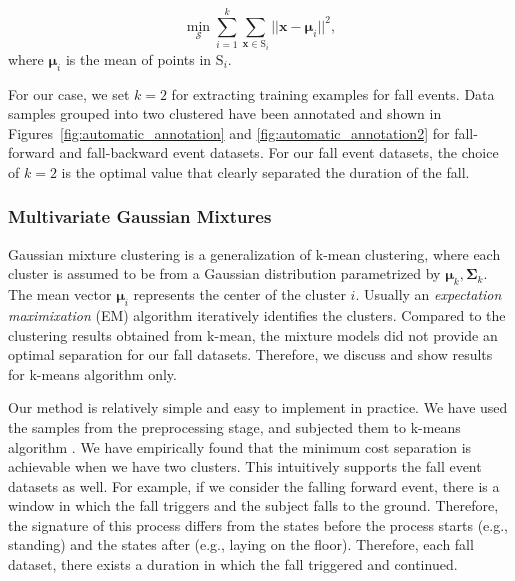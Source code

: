 \documentclass{IEEEtran}
\begin{document}
$$ \min _{\mathcal{S}} \sum_{i=1}^{k} \sum_{\mathbf{x} \in \mathrm{S}_i} || \mathbf{x} - 
\boldsymbol{\mu}_i 
||^2,$$
where $\boldsymbol{\mu}_i $ is the mean of points in $\mathrm{S}_i$.

For our case, we set $k = 2$ for extracting  training examples for fall events. Data samples grouped into two
clustered have been annotated and shown in Figures~\ref{fig:automatic_annotation} and 
\ref{fig:automatic_annotation2} for fall-forward and fall-backward event datasets. For our fall event datasets, the choice of $k=2$ is the 
optimal value that clearly separated the duration of the fall. 


\subsubsection{Multivariate Gaussian Mixtures}

Gaussian mixture clustering is a generalization of k-mean clustering, where each cluster 
is assumed to be from a Gaussian distribution parametrized by $\boldsymbol{\mu}_k, 
\boldsymbol{\Sigma}_k$. The mean vector $\boldsymbol{\mu}_i$ represents the center of the 
cluster $i$. 
Usually an \emph{expectation maximixation} (EM) algorithm iteratively identifies the 
clusters. Compared to the clustering results obtained from k-mean, the mixture models did not 
provide an optimal separation for our fall datasets. Therefore, we discuss and show results for
k-means algorithm only. 
 


Our method is relatively simple and easy to implement in practice. We have used the 
samples from the preprocessing stage, and subjected them to k-means algorithm 
\cite{Bishop06a}. We have empirically found that the minimum cost separation is 
achievable when we have two clusters. This intuitively supports the fall event datasets 
as well. For 
example, if we consider the falling forward event, there is a window in which the fall 
triggers and the subject falls to the ground. Therefore, the signature of this process 
differs from the states before the process starts (e.g., standing) and the states after 
(e.g., laying on the floor). Therefore, each fall dataset, there exists a duration in 
which the fall triggered and continued.
\end{document}
